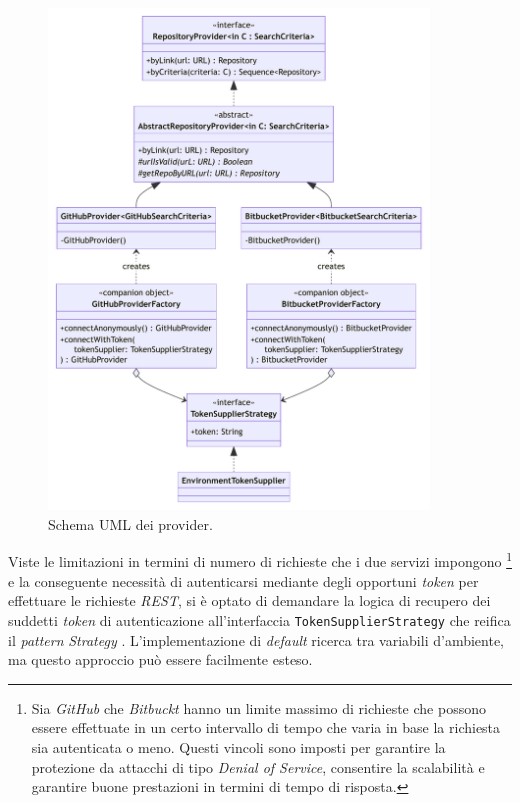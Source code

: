 \begin{figure}[h!]
    \centering
    \includegraphics[width=0.9\textwidth]{resources/img/02-provider.pdf}
    \caption{Schema UML dei provider.}
    \label{img:02-provider}
\end{figure}

Viste le limitazioni in termini di numero di richieste che i due servizi impongono \footnote{Sia \textit{GitHub} che \textit{Bitbuckt} hanno un limite massimo di richieste che possono essere effettuate in un certo intervallo di tempo che varia in base la richiesta sia autenticata o meno. Questi vincoli sono imposti per garantire la protezione da attacchi di tipo \textit{Denial of Service}, consentire la scalabilità e garantire buone prestazioni in termini di tempo di risposta.} e la conseguente necessità di autenticarsi mediante degli opportuni \textit{token} per effettuare le richieste \textit{REST}, si è optato di demandare la logica di recupero dei suddetti \textit{token} di autenticazione all'interfaccia \texttt{TokenSupplierStrategy} che reifica il \textit{pattern} \textit{Strategy} \cite{gof}.
%
L'implementazione di \textit{default} ricerca tra variabili d'ambiente, ma questo approccio può essere facilmente esteso.

